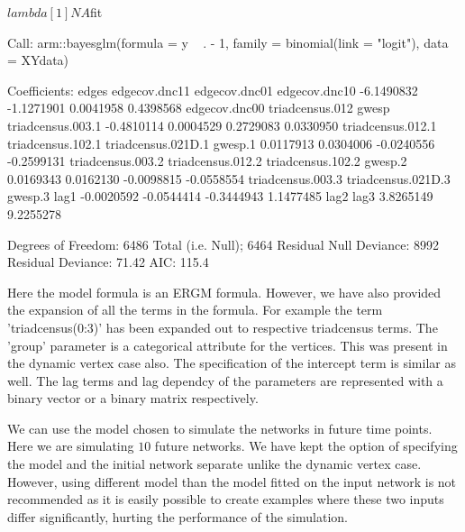 \documentclass[12pt]{article}
\begin{document}
\begin{Schunk}
\begin{Soutput}
$lambda
[1] NA

$fit

Call:  arm::bayesglm(formula = y ~ . - 1, family = binomial(link = "logit"), 
    data = XYdata)

Coefficients:
             edges       edgecov.dnc11       edgecov.dnc01       edgecov.dnc10  
        -6.1490832          -1.1271901           0.0041958           0.4398568  
     edgecov.dnc00     triadcensus.012               gwesp   triadcensus.003.1  
        -0.4810114           0.0004529           0.2729083           0.0330950  
 triadcensus.012.1   triadcensus.102.1  triadcensus.021D.1             gwesp.1  
         0.0117913           0.0304006          -0.0240556          -0.2599131  
 triadcensus.003.2   triadcensus.012.2   triadcensus.102.2             gwesp.2  
         0.0169343           0.0162130          -0.0098815          -0.0558554  
 triadcensus.003.3  triadcensus.021D.3             gwesp.3                lag1  
        -0.0020592          -0.0544414          -0.3444943           1.1477485  
              lag2                lag3  
         3.8265149           9.2255278  

Degrees of Freedom: 6486 Total (i.e. Null);  6464 Residual
Null Deviance:	    8992 
Residual Deviance: 71.42 	AIC: 115.4
\end{Soutput}
\end{Schunk}

Here the model formula is an ERGM formula. However, we have also provided the expansion of all the terms in the formula. For example the term 'triadcensus(0:3)' has been expanded out to respective triadcensus terms. The 'group' parameter is a categorical attribute for the vertices. This was present in the dynamic vertex case also. The specification of the intercept term is similar as well. The lag terms and lag dependcy of the parameters are represented with a binary vector or a binary matrix respectively.

We can use the model chosen to simulate the networks in future time points. Here we are simulating $10$ future networks. We have kept the option of specifying the model and the initial network separate unlike the dynamic vertex case. However, using different model than the model fitted on the input network is not recommended as it is easily possible to create examples where these two inputs differ significantly, hurting the performance of the simulation.
\end{document}
